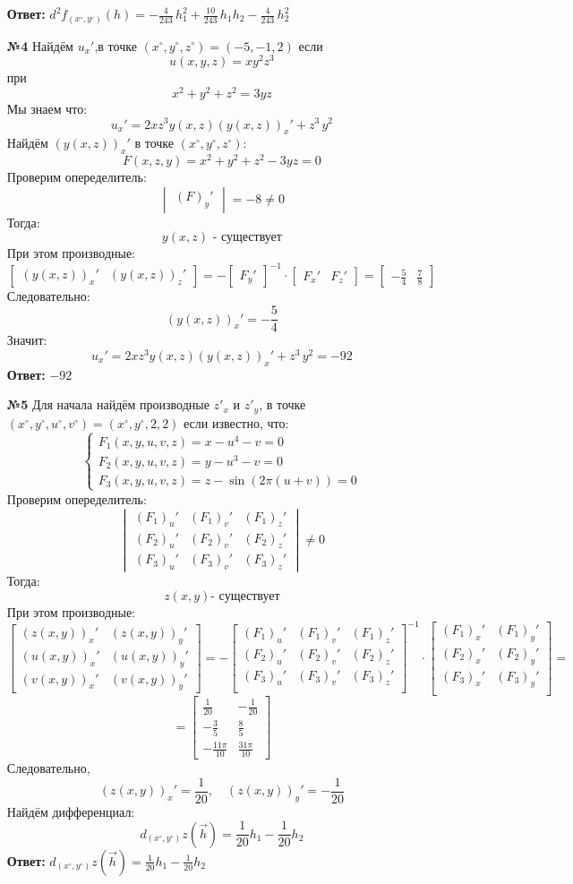 \documentclass[a4paper]{article}
\newcommand{\matsq}[1]{\begin{bmatrix} #1 \end{bmatrix}}
\newcommand{\vmat}[1]{\begin{vmatrix} #1 \end{vmatrix}}
\renewcommand{\f}[2]{\frac{#1}{#2}}
\newcommand{\case}[1]{\begin{cases} #1 \end{cases}}
\begin{document}
\begin{enumerate}
    \textbf{Ответ: } $d^2f_{(x^\circ, y^\circ)}(h)= -\frac{4}{243} \, h_1^2 + \frac{10}{243} \, h_1h_2 - \frac{4}{243} \, h_2^2$\\

    \item[\textbf{№4}]Найдём $u_x'$,в точке $(x^\circ, y^\circ, z^\circ) = (-5, -1, 2)$ если 
    $$u(x, y, z) = xy^2z^3$$
    при 
    $$x^2+y^2+z^2=3yz$$
    Мы знаем что:
    $$u_x' = 2x{z}^{3}y(x, z)(y(x, z))_x'+{z}^{3}\,{y}^{2}$$
    Найдём $(y(x, z))_x'$ в точке $(x^\circ, y^\circ, z^\circ)$:
    $$F(x, z, y) = x^2+y^2+z^2-3yz = 0$$
    Проверим опеределитель:
    $$\vmat{(F)_{y}'}  = -8\neq 0$$
    Тогда:
    $$y(x, z) \text{ - существует}$$
    При этом производные:
    $$
    \matsq{(y(x, z))_x' & (y(x, z))_z'} = 
    -\matsq{F_y'}^{-1}\cdot \matsq{F_x' & F_z'} = \matsq{-\f{5}{4} & \f{7}{8}}$$
    Следовательно:
    $$(y(x, z))_x' = -\f{5}{4}$$
    Значит:
    $$u_x' = 2x{z}^{3}y(x, z)(y(x, z))_x'+{z}^{3}\,{y}^{2} = -92$$
    \textbf{Ответ: } $-92$\\


    \item[\textbf{№5}]Для начала найдём производные $z'_x$ и $z'_y$, в точке
    $(x^\circ, y^\circ, u^\circ, v^\circ) = (x^\circ, y^\circ, 2, 2)$
    если известно, что:
    $$\case{
        F_1(x, y, u, v, z) = x-u^4-v = 0\\
        F_2(x, y, u, v, z) = y-u^3-v = 0\\
        F_3(x, y, u, v, z) = z-\sin(2\pi (u+v)) = 0
    }$$
    Проверим опеределитель:
    $$\vmat{
        (F_1)_u' & (F_1)_v' & (F_1)_z' \\ 
        (F_2)_u' & (F_2)_v' & (F_2)_z'\\
        (F_3)_u' & (F_3)_v' & (F_3)_z'
    } \neq 0$$
    Тогда:
    $$z(x, y) \text{- существует}$$
    При этом производные:
    $$\matsq{
        (z(x, y))_x' & (z(x, y))_y' \\
        (u(x, y))_x' & (u(x, y))_y' \\
        (v(x, y))_x' & (v(x, y))_y'
    } = 
    -\matsq{
        (F_1)_u' & (F_1)_v' & (F_1)_z' \\
        (F_2)_u' & (F_2)_v' & (F_2)_z' \\
        (F_3)_u' & (F_3)_v' & (F_3)_z' \\
    }^{-1} \cdot
    \matsq{
        (F_1)_x' & (F_1)_y'\\
        (F_2)_x' & (F_2)_y'\\
        (F_3)_x' & (F_3)_y'\\
    } =$$
    $$= \begin{bmatrix}
        \frac{1}{20} & -\frac{1}{20} \\
        -\frac{3}{5} & \frac{8}{5} \\
        -\frac{11\pi}{10} & \frac{31\pi}{10}
        \end{bmatrix}$$
    Следовательно,
    $$(z(x, y))_x' = \frac{1}{20}, \quad (z(x, y))_y' = -\frac{1}{20}$$
    Найдём дифференциал:
    $$d_{(x^\circ, y^\circ)} z(\vec{h}) = \frac{1}{20} h_1 -\frac{1}{20} h_2 $$
    \textbf{Ответ: } $d_{(x^\circ, y^\circ)} z(\vec{h}) = \frac{1}{20} h_1 -\frac{1}{20} h_2 $
\end{enumerate}
\end{document}

